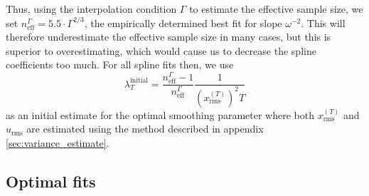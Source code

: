 \documentclass[10pt,journal]{IEEEtran}
\begin{document}
Thus, using the interpolation condition $\Gamma$ to estimate the effective sample size, we set $n_{\textrm{eff}}^\Gamma = 5.5 \cdot \Gamma^{2/3}$, the empirically determined best fit for slope $\omega^{-2}$. This will therefore underestimate the effective sample size in many cases, but this is superior to overestimating, which would cause us to decrease the spline coefficients too much. For all spline fits then, we use
\begin{equation}
\label{lambda_initial_guess}
\lambda^{\textrm{initial}}_T = \frac{n_{\textrm{eff}}^\Gamma-1}{n_{\textrm{eff}}^\Gamma} \frac{1}{ \left(x^{(T)}_{\textrm{rms}}\right)^2  T}
\end{equation}
as an initial estimate for the optimal smoothing parameter where both $x^{(T)}_{\textrm{rms}}$ and $u_\textrm{rms}$ are estimated using the method described in appendix \ref{sec:variance_estimate}.




\subsection{Optimal fits} \label{optimal_fits}
\end{document}
